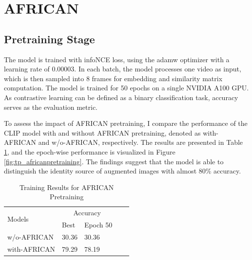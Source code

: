 

\section{AFRICAN}
\subsection{Pretraining Stage}
The model is trained with infoNCE \parencite{oord2019representation} loss, using the adamw optimizer with a learning rate of 0.00003. In each batch, the model processes one video as input, which is then sampled into 8 frames for embedding and similarity matrix computation. The model is trained for 50 epochs on a single NVIDIA A100 GPU. As contrastive learning can be defined as a binary classification task, accuracy serves as the evaluation metric.

To assess the impact of AFRICAN pretraining, I compare the performance of the CLIP model with and without AFRICAN pretraining, denoted as with-AFRICAN and w/o-AFRICAN, respectively. The results are presented in Table \ref{tab:africanpretrainingresults}, and the epoch-wise performance is visualized in Figure \ref{fig:tp_africanpretraining}. The findings suggest that the model is able to distinguish the identity source of augmented images with almost 80\% accuracy. 

\begin{table}[ht]
    \centering
    \caption{Training Results for AFRICAN Pretraining}
    \label{tab:africanpretrainingresults}
    \begin{tabular}{lllll}
        \toprule
        \multirow{2}{*}{Models} & \multicolumn{2}{c}{Accuracy} \\
        \cmidrule{2-3} 
        {} &  Best & Epoch 50\\
        \midrule
        w/o-AFRICAN   & 30.36 & 30.36 \\
        with-AFRICAN  & 79.29 & 78.19 \\
        \bottomrule
    \end{tabular}
\end{table}

